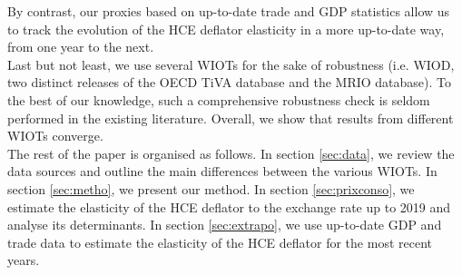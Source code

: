 \documentclass[11pt,a4paper]{paper} %
\begin{document}
By contrast, our proxies based on up-to-date trade and GDP statistics allow us to track the evolution of the HCE deflator elasticity in a more up-to-date way, from one year to the next. \\
Last but not least, we use several WIOTs for the sake of robustness (i.e. WIOD, two distinct releases of the OECD TiVA database and the MRIO database). 
To the best of our knowledge, such a comprehensive robustness check is seldom performed in the existing literature.
Overall, we show that results from different WIOTs converge. \\
The rest of the paper is organised as follows.
In section \ref{sec:data}, we review the data sources and outline the main differences between the various WIOTs.
In section \ref{sec:metho}, we present our method.
In section \ref{sec:prixconso}, we estimate the elasticity of the HCE deflator to the exchange rate up to 2019 and analyse its determinants.
In section \ref{sec:extrapo}, we use up-to-date GDP and trade data to estimate the elasticity of the HCE deflator for the most recent years.


\end{document}
